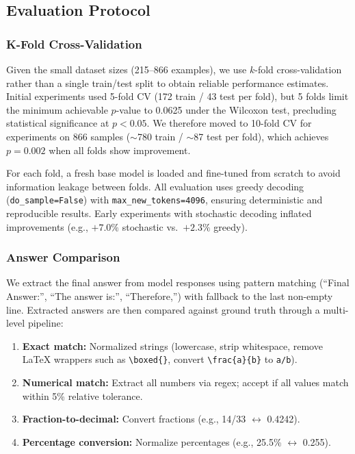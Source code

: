 \subsection{Evaluation Protocol}
\label{sec:sft:eval}

\subsubsection{K-Fold Cross-Validation}

Given the small dataset sizes (215--866 examples), we use $k$-fold cross-validation rather than a single train/test split to obtain reliable performance estimates. Initial experiments used 5-fold CV (172 train / 43 test per fold), but 5 folds limit the minimum achievable $p$-value to 0.0625 under the Wilcoxon test, precluding statistical significance at $p < 0.05$. We therefore moved to 10-fold CV for experiments on 866 samples ($\sim$780 train / $\sim$87 test per fold), which achieves $p = 0.002$ when all folds show improvement.

For each fold, a fresh base model is loaded and fine-tuned from scratch to avoid information leakage between folds. All evaluation uses greedy decoding (\texttt{do\_sample=False}) with \texttt{max\_new\_tokens=4096}, ensuring deterministic and reproducible results. Early experiments with stochastic decoding inflated improvements (e.g., $+7.0\%$ stochastic vs.\ $+2.3\%$ greedy).

\subsubsection{Answer Comparison}

We extract the final answer from model responses using pattern matching (``Final Answer:'', ``The answer is:'', ``Therefore,'') with fallback to the last non-empty line. Extracted answers are then compared against ground truth through a multi-level pipeline:

\begin{enumerate}
    \item \textbf{Exact match:} Normalized strings (lowercase, strip whitespace, remove LaTeX wrappers such as \verb|\boxed{}|, convert \verb|\frac{a}{b}| to \verb|a/b|).
    \item \textbf{Numerical match:} Extract all numbers via regex; accept if all values match within 5\% relative tolerance.
    \item \textbf{Fraction-to-decimal:} Convert fractions (e.g., 14/33 $\leftrightarrow$ 0.4242).
    \item \textbf{Percentage conversion:} Normalize percentages (e.g., 25.5\% $\leftrightarrow$ 0.255).
\end{enumerate}

